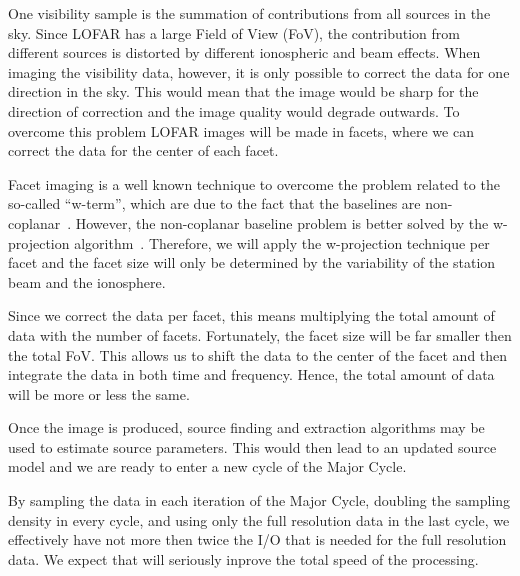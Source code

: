 \documentclass[journal]{IEEEtran}
\begin{document}
One visibility sample is the summation of contributions from all sources in the sky. Since LOFAR has a large Field of View (FoV), the contribution from different sources is distorted by different ionospheric and beam effects. When imaging the visibility data, however, it is only possible to correct the data for one direction in the sky. This would mean that the image would be sharp for the direction of correction and the image quality would degrade outwards. To overcome this problem LOFAR images will be made in facets, where we can correct the data for the center of each facet. 

Facet imaging is a well known technique to overcome the problem related to the so-called ``w-term'', which are due to the fact that the baselines are non-coplanar~\cite{SIRAII:99}. However, the non-coplanar baseline problem is better solved by the w-projection algorithm~\cite{Cornwell:05}. Therefore, we will apply the w-projection technique per facet and the facet size will only be determined by the variability of the station beam and the ionosphere.

Since we correct the data per facet, this means multiplying the total amount of data with the number of facets. Fortunately, the facet size will be far smaller then the total FoV. This allows us to shift the data to the center of the facet and then integrate the data in both time and frequency. Hence, the total amount of data will be more or less the same.
  
Once the image is produced, source finding and extraction algorithms may be used to estimate source parameters. This would then lead to an updated source model and we are ready to enter a new cycle of the Major Cycle. 

By sampling the data in each iteration of the Major Cycle, doubling the sampling density in every cycle, and using only the full resolution data in the last cycle, we effectively have not more then twice the I/O that is needed for the full resolution data. We expect that will seriously inprove the total speed of the processing.

\end{document}
